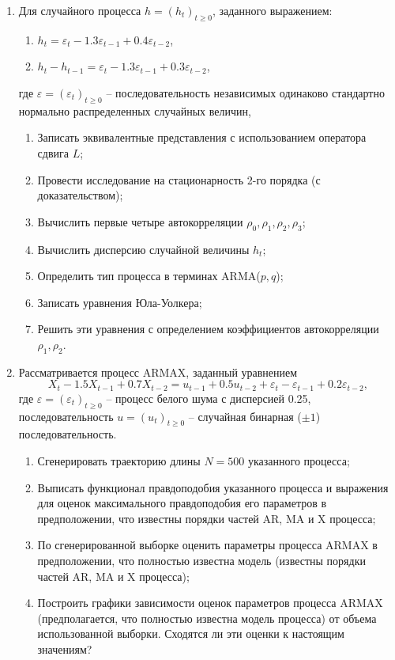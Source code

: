 \documentclass[a4paper,14pt]{extreport}
\renewcommand{\=}[1]{\stackrel{#1}{=}} %
\newcommand{\generaltime}{t \geqslant 0}
\newcommand{\newprocess}[1]{
	\ensuremath{
		#1 = \left(#1 _t\right)_{\generaltime}
	}
}
\begin{document}
\begin{enumerate}
	\item Для случайного процесса $\newprocess{h}$, заданного выражением:
	\begin{enumerate}
		\item $h_t = \varepsilon_t - 1.3 \varepsilon_{t-1} + 0.4 \varepsilon_{t-2}$,
		\item $h_t - h_{t-1} = \varepsilon_t - 1.3 \varepsilon_{t-1} + 0.3 \varepsilon_{t-2}$,
	\end{enumerate}
	где $\newprocess{\varepsilon}$ -- последовательность независимых
	одинаково стандартно нормально распределенных случайных величин,
	\begin{enumerate}
	\item Записать эквивалентные представления с использованием оператора сдвига $L$;
	\item Провести исследование на стационарность 2-го порядка (с доказательством);
	\item Вычислить первые четыре автокорреляции $\rho_0, \rho_1, \rho_2, \rho_3$;
	\item Вычислить дисперсию случайной величины $h_t$;
	\item Определить тип процесса в терминах ARMA($p, q$);
	\item Записать уравнения Юла-Уолкера;
	\item Решить эти уравнения с определением коэффициентов автокорреляции $\rho_1, \rho_2$.
	\end{enumerate}

	\item Рассматривается процесс ARMAX, заданный уравнением
	\[
	X_t - 1.5 X_{t-1} + 0.7 X_{t-2} = u_{t-1} + 0.5 u_{t-2} + 
		\varepsilon_{t} - \varepsilon_{t-1} + 0.2 \varepsilon_{t-2},
	\]
	где $\newprocess{\varepsilon}$ -- процесс белого шума с дисперсией 0.25,
	последовательность $\newprocess{u}$ -- случайная бинарная ($\pm 1$) последовательность.
	\begin{enumerate}
		\item Сгенерировать траекторию длины $N = 500$ указанного процесса;
		\item Выписать функционал правдоподобия указанного процесса
		и выражения для оценок максимального правдоподобия его параметров
		в предположении, что известны порядки частей AR, MA и X процесса;
		\item По сгенерированной выборке оценить параметры
		процесса ARMAX в предположении, что полностью известна
		модель (известны порядки частей AR, MA и X процесса);
		\item Построить графики зависимости оценок параметров
		процесса ARMAX (предполагается, что полностью известна
		модель процесса) от объема использованной выборки.
		Сходятся ли эти оценки к настоящим значениям?
	\end{enumerate}


\end{enumerate}
\end{document}
